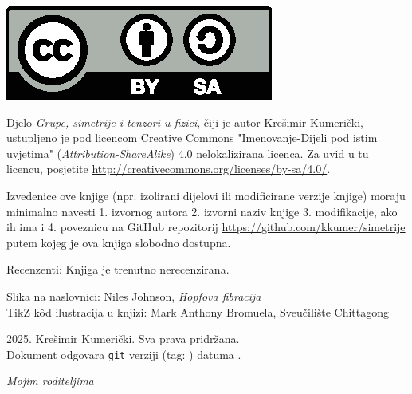 
\thispagestyle{empty}

\vspace*{5em}


\centerline{\includegraphics[scale=1.0,clip]{figures/by-sa.eps}}
Djelo \emph{Grupe, simetrije i tenzori u fizici}, čiji je autor Krešimir
Kumerički, ustupljeno je pod licencom Creative Commons 
"Imenovanje-Dijeli pod istim uvjetima" (\emph{Attribution-ShareAlike}) 
4.0 nelokalizirana licenca. Za uvid u tu licencu, posjetite
\url{http://creativecommons.org/licenses/by-sa/4.0/}.

Izvedenice ove knjige (npr. izolirani dijelovi ili modificirane verzije knjige) moraju minimalno
navesti 1. izvornog autora 2. izvorni naziv knjige 3. modifikacije, ako ih ima i
4. poveznicu na GitHub repozitorij
\url{https://github.com/kkumer/simetrije} putem kojeg je ova knjiga
slobodno dostupna.


\vspace*{6em}
Recenzenti: Knjiga je trenutno nerecenzirana.


\vspace*{3em}
Slika na naslovnici: Niles Johnson, \emph{Hopfova fibracija}\\
TikZ k\^{o}d ilustracija u knjizi: Mark Anthony Bromuela, Sveučilište Chittagong

\vspace*{3em}
\textcopyright{} 2025. Krešimir Kumerički. Sva prava pridržana.\\
\small
Dokument odgovara \texttt{git} verziji \texttt{\githash} (tag: \texttt{\gittag}) datuma \gitdate.

\cleardoublepage
\thispagestyle{empty}
\vspace*{10em}
\begin{flushright}
    \emph{Mojim roditeljima}
\end{flushright}
\cleardoublepage
